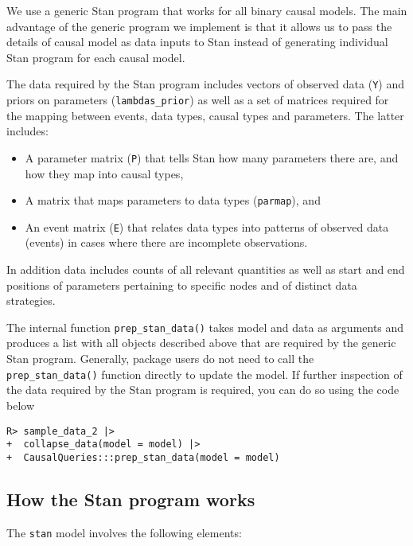 \documentclass[
  11pt,
  article]{jss}
\providecommand{\tightlist}{%
  \setlength{\itemsep}{0pt}\setlength{\parskip}{0pt}}\usepackage{longtable,booktabs,array}
\begin{document}
We use a generic Stan program that works for all binary causal models.
The main advantage of the generic program we implement is that it allows
us to pass the details of causal model as data inputs to Stan instead of
generating individual Stan program for each causal model.

The data required by the Stan program includes vectors of observed data
(\texttt{Y}) and priors on parameters (\texttt{lambdas\_prior}) as well
as a set of matrices required for the mapping between events, data
types, causal types and parameters. The latter includes:

\begin{itemize}
\tightlist
\item
  A parameter matrix (\texttt{P}) that tells Stan how many parameters
  there are, and how they map into causal types,
\item
  A matrix that maps parameters to data types (\texttt{parmap}), and
\item
  An event matrix (\texttt{E}) that relates data types into patterns of
  observed data (events) in cases where there are incomplete
  observations.
\end{itemize}

In addition data includes counts of all relevant quantities as well as
start and end positions of parameters pertaining to specific nodes and
of distinct data strategies.

The internal function \texttt{prep\_stan\_data()} takes model and data
as arguments and produces a list with all objects described above that
are required by the generic Stan program. Generally, package users do
not need to call the \texttt{prep\_stan\_data()} function directly to
update the model. If further inspection of the data required by the Stan
program is required, you can do so using the code below

\begin{verbatim}
R> sample_data_2 |> 
+  collapse_data(model = model) |> 
+  CausalQueries:::prep_stan_data(model = model)
\end{verbatim}

\hypertarget{how-the-stan-program-works}{%
\subsection{How the Stan program
works}\label{how-the-stan-program-works}}

The \texttt{stan} model involves the following elements:
\end{document}
